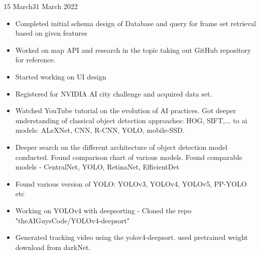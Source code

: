 \documentclass{diaryformat}
\begin{document}
\begin{workDone}{15 March}{31 March 2022}
	\begin{itemize}
		\item Completed initial schema design of Database and query for frame set retrieval based on given features
		\item Worked on map API and research in the topic taking out GitHub repository for reference.
		\item Started working on UI design
		\item Registered for NVIDIA AI city challenge and acquired data set.
		\item Watched YouTube tutorial on the evolution of AI practices. Got deeper understanding of classical object detection approaches: HOG, SIFT,... to ai models: ALeXNet, CNN, R-CNN, YOLO, mobile-SSD.
		\item Deeper search on the different architecture of object detection model conducted. Found comparison chart of various models. Found comparable models - CentralNet, YOLO, RetinaNet, EfficientDet
		\item Found various version of YOLO: YOLOv3, YOLOv4, YOLOv5, PP-YOLO etc
		\item Working on YOLOv4 with deepsorting - Cloned the repo "theAIGuysCode/YOLOv4-deepsort"
		\item Generated tracking video using the yolov4-deepsort. used pretrained weight download from darkNet.
	\end{itemize}

\end{workDone}
\end{document}
